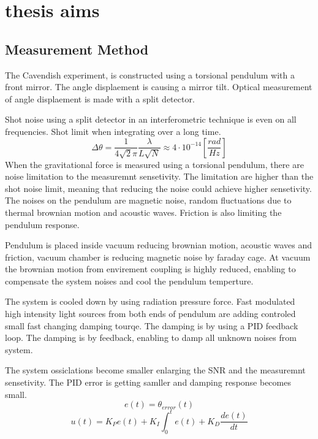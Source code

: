 \documentclass[\main/master.tex]{subfiles}
\begin{document}
\chapter{thesis aims}\label{chp:example-2}
\section{Measurement Method}
The Cavendish experiment, is constructed using a torsional pendulum with a front mirror. The angle displaement is causing a mirror tilt. Optical measurement of angle displaement is made with a split detector. 
\par
Shot noise using a split detector in an interferometric technique is even on all frequencies. Shot limit when integrating over a long time.
\begin{equation}
\Delta\theta = \frac{1}{4\sqrt{2}\pi}\frac{\lambda}{L\sqrt{N}} \approx
4\cdot10^{-14} [\frac{rad}{Hz}]    \label{eqn:gravitation_tourqe}
\end{equation}
When the gravitational force is measured using a torsional pendulum, there are noise limitation to the measuremnt sensetivity. The limitation are higher than the shot noise limit, meaning that reducing the noise could achieve higher sensetivity. The noises on the pendulum are magnetic noise, random fluctuations due to thermal brownian motion and acoustic waves. Friction is also limiting the pendulum response. 
\par
Pendulum is placed inside vacuum reducing brownian motion, acoustic waves and friction, vacuum chamber is reducing magnetic noise by faraday cage. At vacuum the brownian motion from envirement coupling is highly reduced, enabling to compensate the system noises and cool the pendulum temperture.
\par
The system is cooled down by using radiation pressure force. Fast modulated high intensity light sources from both ends of pendulum are adding controled small fast changing damping tourqe. The damping is by using a PID feedback loop. The damping is by feedback, enabling to damp all unknown noises from system. 
\par
The system ossiclations become smaller enlarging the SNR and the measuremnt sensetivity. The PID error is getting samller and damping response becomes small. 
\begin{equation}
e(t) = \theta_{error}(t)   \label{eqn:pid_error}
\end{equation}
\begin{equation}
u(t) = K_Pe(t)+K_I\int_{0}^{t}e(t)+K_D\frac{de(t)}{dt}   \label{eqn:PID_eq}
\end{equation}
\end{document}
